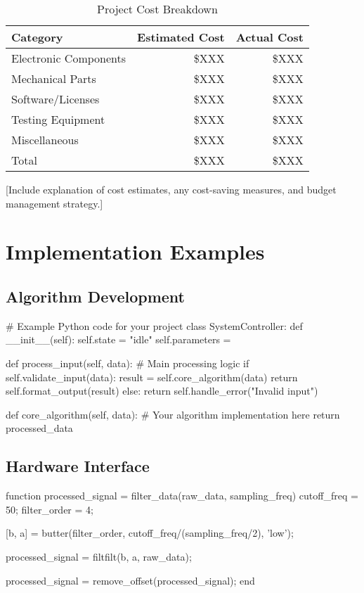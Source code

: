 \documentclass[final]{../designreport}
\begin{document}
\begin{table}[htbp]
\centering
\caption{Project Cost Breakdown}
\begin{tabular}{@{}lrr@{}}
\toprule
Category & Estimated Cost & Actual Cost \\
\midrule
Electronic Components & \$XXX & \$XXX \\
Mechanical Parts & \$XXX & \$XXX \\
Software/Licenses & \$XXX & \$XXX \\
Testing Equipment & \$XXX & \$XXX \\
Miscellaneous & \$XXX & \$XXX \\
\midrule
Total & \$XXX & \$XXX \\
\bottomrule
\end{tabular}
\end{table}

[Include explanation of cost estimates, any cost-saving measures, and budget management strategy.]

\section{Implementation Examples}

\subsection{Algorithm Development}

\begin{reportpython}[caption={Core Algorithm Implementation}]
# Example Python code for your project
class SystemController:
    def __init__(self):
        self.state = "idle"
        self.parameters = {}
    
    def process_input(self, data):
        # Main processing logic
        if self.validate_input(data):
            result = self.core_algorithm(data)
            return self.format_output(result)
        else:
            return self.handle_error("Invalid input")
    
    def core_algorithm(self, data):
        # Your algorithm implementation here
        return processed_data
\end{reportpython}

\subsection{Hardware Interface}

\begin{reportmatlab}[caption={Signal Processing Functions}]
function processed_signal = filter_data(raw_data, sampling_freq)
    cutoff_freq = 50; %
    filter_order = 4;
    
    [b, a] = butter(filter_order, cutoff_freq/(sampling_freq/2), 'low');
    
    processed_signal = filtfilt(b, a, raw_data);
    
    processed_signal = remove_offset(processed_signal);
end
\end{reportmatlab}
\end{document}
